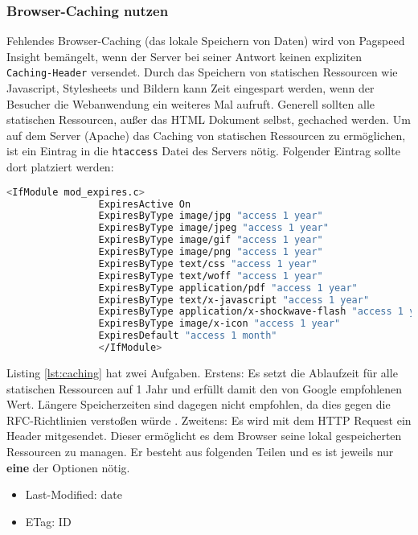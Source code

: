 			\subsubsection{Browser-Caching nutzen} %
			\label{ssub:browser_caching_nutzen}
				Fehlendes Browser-Caching (das lokale Speichern von Daten) wird von Pagspeed Insight bemängelt, wenn der Server bei seiner Antwort keinen expliziten \texttt{Caching-Header} versendet.
				Durch das Speichern von statischen Ressourcen wie Javascript, Stylesheets und Bildern kann Zeit eingespart werden, wenn der Besucher die Webanwendung ein weiteres Mal aufruft. Generell sollten alle statischen Ressourcen, außer das HTML Dokument selbst, gechached werden.
				Um auf dem Server (Apache) das Caching von statischen Ressourcen zu ermöglichen, ist ein Eintrag in die \texttt{htaccess} Datei des Servers nötig. Folgender Eintrag sollte dort platziert werden:

			  \begin{lstlisting}[captionpos=b, caption=Aktivieren von Browser Caching in Apache (Listing nach: \autocite{sextonCaching}), label=lst:caching, language=bash]
			  	<IfModule mod_expires.c>
			  	ExpiresActive On
			  	ExpiresByType image/jpg "access 1 year"
			  	ExpiresByType image/jpeg "access 1 year"
			  	ExpiresByType image/gif "access 1 year"
			  	ExpiresByType image/png "access 1 year"
			  	ExpiresByType text/css "access 1 year"
			  	ExpiresByType text/woff "access 1 year"
			  	ExpiresByType application/pdf "access 1 year"
			  	ExpiresByType text/x-javascript "access 1 year"
			  	ExpiresByType application/x-shockwave-flash "access 1 year"
			  	ExpiresByType image/x-icon "access 1 year"
			  	ExpiresDefault "access 1 month"
			  	</IfModule>
			  \end{lstlisting}

			  Listing \ref{lst:caching} hat zwei Aufgaben. Erstens: Es setzt die Ablaufzeit für alle statischen Ressourcen auf 1 Jahr und erfüllt damit den von Google empfohlenen Wert. Längere Speicherzeiten sind dagegen nicht empfohlen, da dies gegen die RFC-Richtlinien verstoßen würde \autocite{google14Caching}. Zweitens: Es wird mit dem HTTP Request ein Header mitgesendet. Dieser ermöglicht es dem Browser seine lokal gespeicherten Ressourcen zu managen. Er besteht aus folgenden Teilen und es ist jeweils nur \textbf{eine} der Optionen nötig.

			  \begin{itemize}
			  	\item Last-Modified: date
			  	\item ETag: ID
			  \end{itemize}

